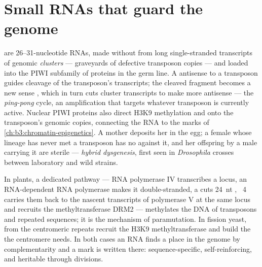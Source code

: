 \section{Small RNAs that guard the genome}

\begin{definition}\label{def:b3:rna-regulation:pirna}
\emph{} are \numrange{26}{31}-nucleotide RNAs, made without 
from long single-stranded transcripts of genomic \emph{ clusters}
--- graveyards of defective transposon copies --- and loaded into the
PIWI subfamily of  proteins in the germ line. A 
antisense to a transposon guides cleavage of the transposon's
transcripts; the cleaved fragment becomes a new sense , which in
turn cuts cluster transcripts to make more antisense  --- the
\emph{ping-pong} cycle, an amplification that targets whatever
transposon is currently active. Nuclear PIWI proteins also direct
H3K9 methylation and  onto the transposon's genomic
copies, connecting the RNA to the  marks of
\cref{ch:b3:chromatin-epigenetics}. A mother deposits her  in the
egg; a female whose lineage has never met a transposon has no 
against it, and her offspring by a male carrying it are sterile ---
\emph{hybrid dysgenesis}, first seen in \emph{Drosophila} crosses
between laboratory and wild strains.
\end{definition}

\begin{proposition}\label{prop:b3:rna-regulation:rddm}
In plants, a dedicated pathway --- RNA polymerase IV transcribes a
locus, an RNA-dependent RNA polymerase makes it double-stranded, a
 cuts \qty{24}{nt} , ~4 carries them back to the
nascent transcripts of polymerase V at the same locus and recruits the
methyltransferase DRM2 --- methylates the DNA of transposons and
repeated sequences; it is the mechanism of paramutation. In fission
yeast,  from the centromeric repeats recruit the H3K9
methyltransferase and build the  the centromere needs.
In both cases an RNA finds a place in the genome by complementarity and
a  mark is written there: sequence-specific, self-reinforcing,
and heritable through divisions.
\end{proposition}

